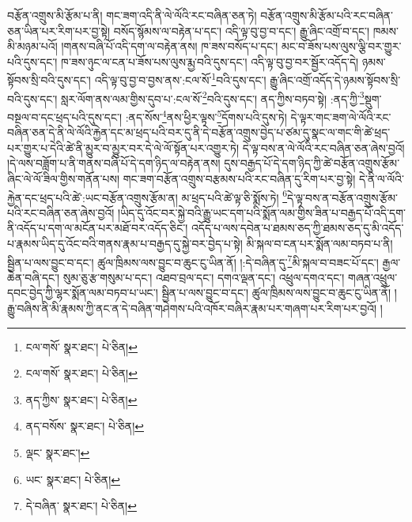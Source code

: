 བརྩོན་འགྲུས་མི་རྩོམ་པ་ནི། གང་ཟག་འདི་ནི་ལེ་ལོའི་རང་བཞིན་ཅན་ཏེ། བརྩོན་འགྲུས་མི་རྩོམ་པའི་རང་བཞིན་ཅན་ཡིན་པར་རིག་པར་བྱ་སྟེ། བསོད་སྙོམས་ལ་བརྟེན་པ་དང་། འདི་ལྟ་བུ་བྱ་བ་དང་། རྒྱུ་ཞིང་འགྲོ་བ་དང་། ཁམས་མི་མཉམ་པའོ། །གནས་བཞི་པོ་འདི་དག་ལ་བརྟེན་ནས། ཁ་ཟས་བསོད་པ་དང་། མང་བ་ཟོས་པས་ལུས་ལྕི་བར་གྱུར་པའི་དུས་དང་། ཁ་ཟས་ཉུང་ལ་ངན་པ་ཟོས་པས་ལུས་རྨྱ་བའི་དུས་དང་། འདི་ལྟ་བུ་བྱ་བར་སྦྱོར་འདོད་དེ། ཉམས་སྟོབས་སྲི་བའི་དུས་དང་། འདི་ལྟ་བུ་བྱ་བ་བྱས་ནས་:ངལ་སོ་\footnote{ངལ་གསོ་  སྣར་ཐང་།  པེ་ཅིན། }བའི་དུས་དང་། རྒྱུ་ཞིང་འགྲོ་འདོད་དེ་ཉམས་སྟོབས་སྲི་བའི་དུས་དང་། སླར་ལོག་ནས་ལམ་གྱིས་དུབ་པ་:ངལ་སོ་\footnote{ངལ་གསོ་  སྣར་ཐང་།  པེ་ཅིན། }བའི་དུས་དང་། ནད་ཀྱིས་བཏབ་སྟེ། :ནད་ཀྱི་\footnote{ནད་ཀྱིས་  སྣར་ཐང་།  པེ་ཅིན། }སྡུག་བསྔལ་བ་དང་ཕྲད་པའི་དུས་དང་། :ནད་སོས་\footnote{ནད་བསོས་  སྣར་ཐང་།  པེ་ཅིན། }ནས་ཕྱིར་ལྟས་\footnote{ལྡང་  སྣར་ཐང་། }དོགས་པའི་དུས་ཏེ། དེ་ལྟར་གང་ཟག་ལེ་ལོའི་རང་བཞིན་ཅན་དེ་ནི་ལེ་ལོའི་རྐྱེན་དང་མ་ཕྲད་པའི་བར་དུ་ནི་དེ་བརྩོན་འགྲུས་བྱེད་པ་ཙམ་དུ་སྣང་ལ་གང་གི་ཚེ་ཕྲད་པར་གྱུར་པ་དེའི་ཚེ་ནི་མྱུར་བ་མྱུར་བར་དེ་ལེ་ལོ་སྟོན་པར་འགྱུར་ཏེ། དེ་ལྟ་བས་ན་ལེ་ལོའི་རང་བཞིན་ཅན་ཞེས་བྱའོ། །དེ་ལས་བཟློག་པ་ནི་གནས་བཞི་པོ་དེ་དག་ཉིད་ལ་བརྟེན་ནས། དུས་བརྒྱད་པོ་དེ་དག་ཉིད་ཀྱི་ཚེ་བརྩོན་འགྲུས་རྩོམ་ཞིང་ལེ་ལོ་ཟིལ་གྱིས་གནོན་པས། གང་ཟག་བརྩོན་འགྲུས་བརྩམས་པའི་རང་བཞིན་དུ་རིག་པར་བྱ་སྟེ། དེ་ནི་ལ་ལོའི་རྐྱེན་དང་ཕྲད་པའི་ཚེ་:ཡང་བརྩོན་འགྲུས་རྩོམ་ན། མ་ཕྲད་པའི་ཚེ་ལྟ་ཅི་སྨོས་ཏེ། \footnote{ཡང་  སྣར་ཐང་།  པེ་ཅིན། }དེ་ལྟ་བས་ན་བརྩོན་འགྲུས་རྩོམ་པའི་རང་བཞིན་ཅན་ཞེས་བྱའོ། །ཡིད་དུ་འོང་བར་སྐྱེ་བའི་རྒྱུ་ཡང་དག་པའི་སྨོན་ལམ་གྱིས་ཟིན་པ་བརྒྱད་པོ་འདི་དག་ནི་འདོད་པ་དག་ལ་མངོན་པར་མཐོ་བར་འདོད་ཅིང་། འདོད་པ་ལས་དབེན་པ་ཐམས་ཅད་ཀྱི་ཐམས་ཅད་དུ་མི་འདོད་པ་རྣམས་ཡིད་དུ་འོང་བའི་གནས་རྣམ་པ་བརྒྱད་དུ་སྐྱེ་བར་བྱེད་པ་སྟེ། མི་སྐལ་བ་ངན་པར་སྨོན་ལམ་བཏབ་པ་ནི། སྦྱིན་པ་ལས་བྱུང་བ་དང་། ཚུལ་ཁྲིམས་ལས་བྱུང་བ་ཆུང་ངུ་ཡིན་ནོ། །:དེ་བཞིན་དུ་\footnote{དེ་བཞིན་  སྣར་ཐང་།  པེ་ཅིན། }མི་སྐལ་བ་བཟང་པོ་དང་། རྒྱལ་ཆེན་བཞི་དང་། སུམ་ཅུ་རྩ་གསུམ་པ་དང་། འཐབ་བྲལ་དང་། དགའ་ལྡན་དང་། འཕྲུལ་དགའ་དང་། གཞན་འཕྲུལ་དབང་བྱེད་ཀྱི་ལྷར་སྨོན་ལམ་བཏབ་པ་ཡང་། སྦྱིན་པ་ལས་བྱུང་བ་དང་། ཚུལ་ཁྲིམས་ལས་བྱུང་བ་ཆུང་ངུ་ཡིན་ནོ། །རྒྱུ་བཞིས་ནི་མི་རྣམས་ཀྱི་ནང་ན་དེ་བཞིན་གཤེགས་པའི་འཁོར་བཞིར་རྣམ་པར་གཞག་པར་རིག་པར་བྱའོ། །
